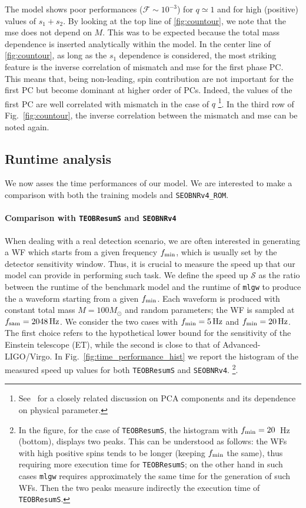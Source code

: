 The model shows poor performances ($\mathcal{F} \sim 10^{-3}$) for ${q\simeq 1}$ and for high (positive) values of $s_1+s_2$.
By looking at the top line of \ref{fig:countour}, we note that the mse does not depend on $M$. This was to be expected because the total mass dependence is inserted analytically within the model.
In the center line of \ref{fig:countour}, as long as the $s_1$ dependence is considered, the most striking feature is the inverse correlation of mismatch and mse for the first phase PC.
This means that, being non-leading, spin contribution are not important for the first PC but become dominant at higher order of PCs.
Indeed, the values of the first PC are well correlated with mismatch in the case of $q$
\footnote{See~\cite{Ohme2013PCA_GW} for a closely related discussion on PCA components and its dependence on physical parameter.}.
In the third row of Fig.~\ref{fig:countour}, the inverse correlation between the mismatch and mse can be noted again.
\subsection{Runtime analysis} \label{sec:runtime}
We now asses the time performances of our model.
We are interested to make a comparison with both
the training models and \texttt{SEOBNRv4\_ROM}.
%
\paragraph{Comparison with \texttt{TEOBResumS} and \texttt{SEOBNRv4}}
When dealing with a real detection scenario, we are often interested in generating a WF which starts from a given frequency 
$f_{\rm min}$, which is usually set by the detector sensitivity window. Thus, it is crucial to measure the speed up that 
our model can provide in performing such task. We define the speed up $\mathcal{S}$ as the ratio between the runtime 
of the benchmark model and the runtime of \texttt{mlgw} to produce the a waveform starting from a given $f_{\rm min}$. 
Each waveform is produced with constant total mass $M = 100 M_{\odot}$ and random parameters; the WF is sampled 
at $f_{\rm sam} = \SI{2048}{Hz}$. We consider the two cases with $f_{\rm min} = \SI{5}{Hz}$ and $f_{\rm min} = \SI{20}{Hz}$. 
The first choice refers to the hypothetical lower bound for the sensitivity of the Einstein telescope (ET), while the second 
is close to that of Advanced-LIGO/Virgo. In Fig.~\ref{fig:time_performance_hist} we report the histogram of the 
measured speed up values for both \texttt{TEOBResumS} and \texttt{SEOBNRv4}.
\footnote{
In the figure, for the case of \texttt{TEOBResumS}, the histogram with $f_{\rm min} = 20$~Hz (bottom), displays two peaks. This can be understood as follows: 
the WFs with high positive spins tends to be longer (keeping $f_{\rm min}$ the same), thus requiring more execution 
time for \texttt{TEOBResumS}; on the other hand in such cases \texttt{mlgw} requires approximately the same time 
for the generation of such WFs. Then the two peaks measure indirectly the execution time of \texttt{TEOBResumS}.}.
  
